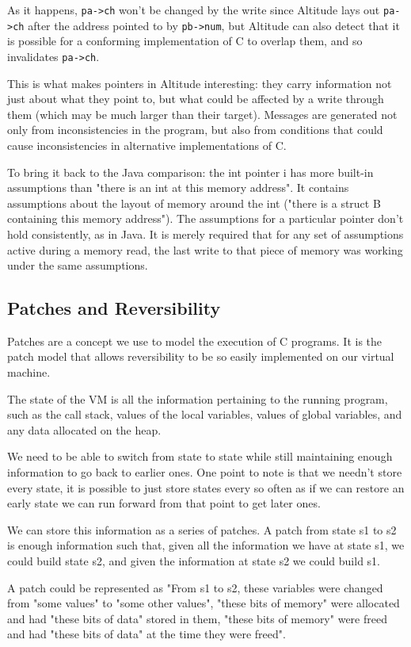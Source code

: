 \documentclass[10pt,a4paper]{report}
\begin{document}
As it happens, \lstinline{pa->ch} won't be changed by the write since Altitude lays out \lstinline{pa->ch} after the address pointed to by \lstinline{pb->num}, but Altitude can also detect that it is possible for a conforming implementation of C to overlap them, and so invalidates \lstinline{pa->ch}.

This is what makes pointers in Altitude interesting: they carry information not just about what they point to, but what could be affected by a write through them (which may be much larger than their target). Messages are generated not only from inconsistencies in the program, but also from conditions that could cause inconsistencies in alternative implementations of C.

To bring it back to the Java comparison: the int pointer i has more built-in assumptions than "there is an int at this memory address". It contains assumptions about the layout of memory around the int ("there is a struct B containing this memory address"). The assumptions for a particular pointer don't hold consistently, as in Java. It is merely required that for any set of assumptions active during a memory read, the last write to that piece of memory was working under the same assumptions.

\subsection{Patches and Reversibility}
Patches are a concept we use to model the execution of C programs. It is the patch model that allows reversibility to be so easily implemented on our virtual machine.

The state of the VM is all the information pertaining to the running program, such as the call stack, values of the local variables, values of global variables, and any data allocated on the heap.

We need to be able to switch from state to state while still maintaining enough information to go back to earlier ones. One point to note is that we needn't store every state, it is possible to just store states every so often as if we can restore an early state we can run forward from that point to get later ones.

We can store this information as a series of patches. A patch from state s1 to s2 is enough information such that, given all the information we have at state s1, we could build state s2, and given the information at state s2 we could build s1.

A patch could be represented as "From s1 to s2, these variables were changed from "some values" to "some other values", "these bits of memory" were allocated and had "these bits of data" stored in them, "these bits of memory" were freed and had "these bits of data" at the time they were freed".
\end{document}
